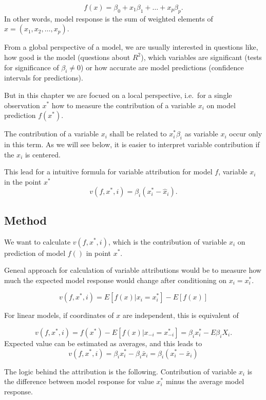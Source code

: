 \documentclass[]{krantz}
\theoremstyle{definition}
\theoremstyle{definition}
\theoremstyle{definition}
\theoremstyle{remark}
\begin{document}
\[
f(x) = \beta_0 + x_1 \beta_1 + \ldots + x_p \beta_p.
\] In other words, model response is the sum of weighted elements of
\(x = (x_1, x_2, \ldots, x_p)\).

From a global perspective of a model, we are usually interested in
questions like, how good is the model (questions about \(R^2\)), which
variables are significant (tests for significance of \(\beta_i \neq 0\))
or how accurate are model predictions (confidence intervals for
predictions).

But in this chapter we are focued on a local perspective, i.e.~for a
single observation \(x^*\) how to measure the contribution of a variable
\(x_i\) on model prediction \(f(x^*)\).

The contribution of a variable \(x_i\) shall be related to
\(x^*_i\beta_i\) as variable \(x_i\) occur only in this term. As we will
see below, it is easier to interpret variable contribution if the
\(x_i\) is centered.

This lead for a intuitive formula for variable attribution for model
\(f\), variable \(x_i\) in the point \(x^*\) \[
v(f, x^*, i) = \beta_i (x_i^* - \hat x_i).
\]

\hypertarget{method}{%
\subsection{Method}\label{method}}

We want to calculate \(v(f, x^*, i)\), which is the contribution of
variable \(x_i\) on prediction of model \(f()\) in point \(x^*\).

Geneal approach for calculation of variable attributions would be to
measure how much the expected model response would change after
conditioning on \(x_i = x_i^*\).

\[
v(f, x^*, i) = E[f(x) | x_i = x_i^*] - E[f(x)]
\]

For linear models, if coordinates of \(x\) are independent, this is
equivalent of

\[
v(f, x^*, i) = f(x^*) - E[f(x)|x_{-i} = x^*_{-i}] = \beta_i x^*_i  - E \beta_i X_i.
\] Expected value can be estimated as averages, and this leads to\\
\[
v(f, x^*, i) = \beta_i x^*_i - \beta_i \bar x_i = \beta_i (x^*_i - \bar x_i)
\]

The logic behind the attribution is the following. Contribution of
variable \(x_i\) is the difference between model response for value
\(x_i^*\) minus the average model response.
\end{document}
